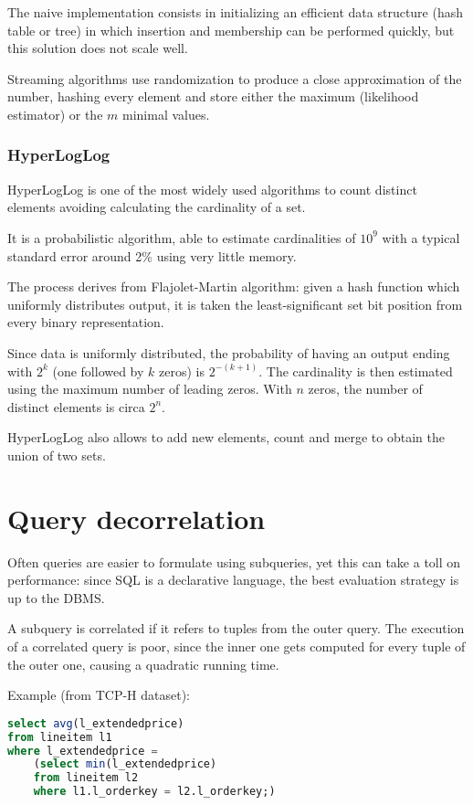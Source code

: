The naive implementation consists in initializing an efficient data structure (hash table or tree) in which insertion and membership can be performed quickly, but this solution does not scale well.

Streaming algorithms use randomization to produce a close approximation of the number, hashing every element and store either the maximum (likelihood estimator) or the $m$ minimal values.

\subsubsection{HyperLogLog}
HyperLogLog is one of the most widely used algorithms to count distinct elements avoiding calculating the cardinality of a set.

It is a probabilistic algorithm, able to estimate cardinalities of $10^{9}$ with a typical standard error around 2\% using very little memory. 

The process derives from Flajolet-Martin algorithm: given a hash function which uniformly distributes output, it is taken the least-significant set bit position from every binary representation. 

Since data is uniformly distributed, the probability of having an output ending with $2^k$ (one followed by $k$ zeros) is $2^{-(k+1)}$. The cardinality is then estimated using the maximum number of leading zeros. With $n$ zeros, the number of distinct elements is circa $2^n$.

HyperLogLog also allows to add new elements, count and merge to obtain the union of two sets.

\section{Query decorrelation}
Often queries are easier to formulate using subqueries, yet this can take a toll on performance: since SQL is a declarative language, the best evaluation strategy is up to the DBMS.

A subquery is correlated if it refers to tuples from the outer query. The execution of a correlated query is poor, since the inner one gets computed for every tuple of the outer one, causing a quadratic running time.

Example (from TCP-H dataset):
\begin{lstlisting}[language=SQL]
select avg(l_extendedprice)
from lineitem l1
where l_extendedprice =
	(select min(l_extendedprice)
	from lineitem l2
	where l1.l_orderkey = l2.l_orderkey;)
\end{lstlisting}

